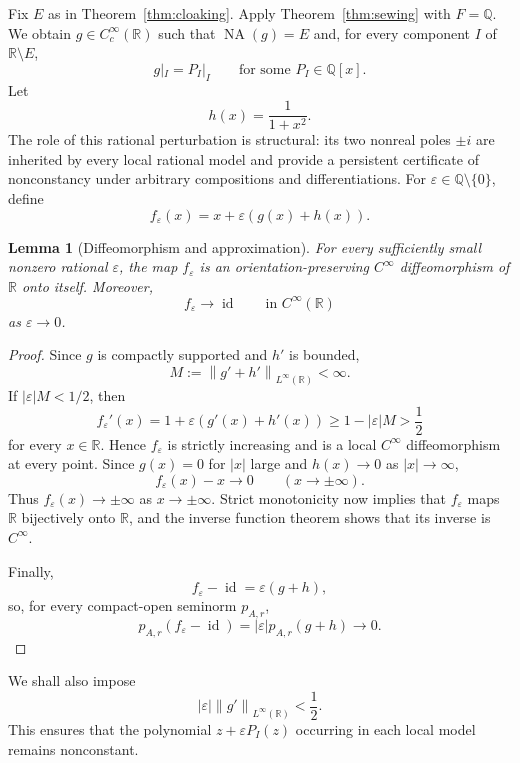 \documentclass[11pt,reqno]{amsart}
\numberwithin{equation}{section}
\newtheorem{lemma}[theorem]{Lemma}
\theoremstyle{definition}
\theoremstyle{remark}
\newcommand{\R}{\mathbb R}
\newcommand{\Q}{\mathbb Q}
\newcommand{\id}{\operatorname{id}}
\newcommand{\NA}{\operatorname{NA}}
\newcommand{\norm}[1]{\left\lVert #1\right\rVert}
\begin{document}
Fix $E$ as in Theorem~\ref{thm:cloaking}. Apply Theorem~\ref{thm:sewing} with $F=\Q$. We obtain $g\in C_c^\infty(\R)$ such that $\NA(g)=E$ and, for every component $I$ of $\R\setminus E$,
\begin{equation}\label{eq:g-piece}
g|_I=P_I|_I
\qquad\text{for some }P_I\in\Q[x].
\end{equation}
Let
\[
h(x)=\frac1{1+x^2}.
\]
The role of this rational perturbation is structural: its two nonreal poles $\pm i$ are inherited by every local rational model and provide a persistent certificate of nonconstancy under arbitrary compositions and differentiations. For $\varepsilon\in\Q\setminus\{0\}$, define
\begin{equation}\label{eq:f-eps}
f_\varepsilon(x)=x+\varepsilon(g(x)+h(x)).
\end{equation}

\begin{lemma}[Diffeomorphism and approximation]\label{lem:diffeomorphism}
For every sufficiently small nonzero rational $\varepsilon$, the map $f_\varepsilon$ is an orientation-preserving $C^\infty$ diffeomorphism of $\R$ onto itself. Moreover,
\[
f_\varepsilon\longrightarrow\id
\qquad\text{in }C^\infty(\R)
\]
as $\varepsilon\to0$.
\end{lemma}

\begin{proof}
Since $g$ is compactly supported and $h'$ is bounded,
\[
M:=\norm{g'+h'}_{L^\infty(\R)}<\infty.
\]
If $|\varepsilon|M<1/2$, then
\[
f_\varepsilon'(x)
=1+\varepsilon(g'(x)+h'(x))
\geq1-|\varepsilon|M>\frac12
\]
for every $x\in\R$. Hence $f_\varepsilon$ is strictly increasing and is a local $C^\infty$ diffeomorphism at every point. Since $g(x)=0$ for $|x|$ large and $h(x)\to0$ as $|x|\to\infty$,
\[
f_\varepsilon(x)-x\longrightarrow0
\qquad(x\to\pm\infty).
\]
Thus $f_\varepsilon(x)\to\pm\infty$ as $x\to\pm\infty$. Strict monotonicity now implies that $f_\varepsilon$ maps $\R$ bijectively onto $\R$, and the inverse function theorem shows that its inverse is $C^\infty$.

Finally,
\[
f_\varepsilon-\id=\varepsilon(g+h),
\]
so, for every compact-open seminorm $p_{A,r}$,
\[
p_{A,r}(f_\varepsilon-\id)
=|\varepsilon|p_{A,r}(g+h)\longrightarrow0.
\]
\end{proof}

We shall also impose
\begin{equation}\label{eq:epsilon-small}
|\varepsilon|\norm{g'}_{L^\infty(\R)}<\frac12.
\end{equation}
This ensures that the polynomial $z+\varepsilon P_I(z)$ occurring in
each local model remains nonconstant.
\end{document}
